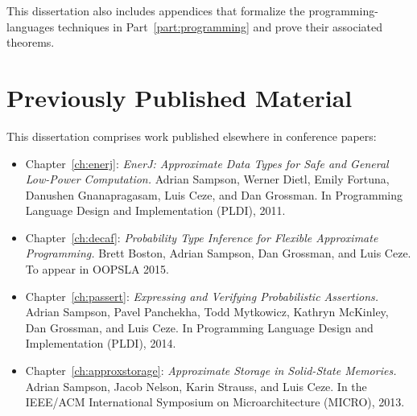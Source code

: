 This dissertation also includes appendices that formalize the
programming-languages techniques in Part~\ref{part:programming} and prove
their associated theorems.


\section{Previously Published Material}

This dissertation comprises work published elsewhere in conference papers:

\begin{itemize}
\item Chapter~\ref{ch:enerj}:
\textit{EnerJ: Approximate Data Types for Safe and General Low-Power
Computation.}
Adrian Sampson, Werner Dietl, Emily Fortuna, Danushen Gnanapragasam, Luis Ceze, and Dan Grossman.
In Programming Language Design and Implementation (PLDI), 2011.
\cite{enerj}

\item Chapter~\ref{ch:decaf}:
\textit{Probability Type Inference for Flexible Approximate Programming.}
Brett Boston, Adrian Sampson, Dan Grossman, and Luis Ceze.
To appear in OOPSLA 2015.
\cite{decaf}

\item Chapter~\ref{ch:passert}:
\textit{Expressing and Verifying Probabilistic Assertions.}
Adrian Sampson, Pavel Panchekha, Todd Mytkowicz, Kathryn McKinley, Dan Grossman, and Luis Ceze.
In Programming Language Design and Implementation (PLDI), 2014.
\cite{passert}

\item Chapter~\ref{ch:approxstorage}:
\textit{Approximate Storage in Solid-State Memories.}
Adrian Sampson, Jacob Nelson, Karin Strauss, and Luis Ceze.
In the IEEE/ACM International Symposium on Microarchitecture (MICRO), 2013.
\cite{approxstorage}
\end{itemize}
